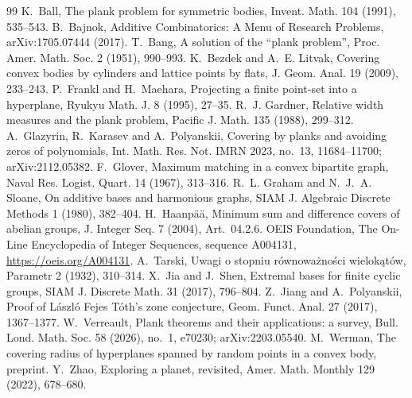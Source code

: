 \documentclass[11pt]{article}
\begin{document}
\begin{thebibliography}{99}
 K.~Ball, The plank problem for symmetric bodies, Invent. Math. 104 (1991), 535--543.
 B.~Bajnok, Additive Combinatorics: A Menu of Research Problems, arXiv:1705.07444 (2017).
 T.~Bang, A solution of the ``plank problem'', Proc. Amer. Math. Soc. 2 (1951), 990--993.
 K.~Bezdek and A.~E. Litvak, Covering convex bodies by cylinders and lattice points by
flats, J. Geom. Anal. 19 (2009), 233--243.
 P.~Frankl and H.~Maehara, Projecting a finite point-set into a hyperplane, Ryukyu Math. J.
8 (1995), 27--35.
 R.~J. Gardner, Relative width measures and the plank problem, Pacific J. Math. 135
(1988), 299--312.
 A.~Glazyrin, R.~Karasev and A.~Polyanskii, Covering by planks and avoiding zeros of
polynomials, Int. Math. Res. Not. IMRN 2023, no.~13, 11684--11700; arXiv:2112.05382.
 F.~Glover, Maximum matching in a convex bipartite graph, Naval Res. Logist. Quart. 14 (1967),
313--316.
 R.~L. Graham and N.~J.~A. Sloane, On additive bases and harmonious graphs, SIAM J.
Algebraic Discrete Methods 1 (1980), 382--404.
 H.~Haanpää, Minimum sum and difference covers of abelian groups, J. Integer Seq. 7
(2004), Art.~04.2.6.
 OEIS Foundation, The On-Line Encyclopedia of Integer Sequences, sequence A004131,
\url{https://oeis.org/A004131}.
 A.~Tarski, Uwagi o stopniu r\'ownowa\.zno\'sci wielok\k{a}t\'ow, Parametr 2 (1932), 310--314.
 X.~Jia and J.~Shen, Extremal bases for finite cyclic groups, SIAM J. Discrete Math. 31
(2017), 796--804.
 Z.~Jiang and A.~Polyanskii, Proof of László Fejes Tóth's zone conjecture, Geom. Funct.
Anal. 27 (2017), 1367--1377.
 W.~Verreault, Plank theorems and their applications: a survey, Bull. Lond. Math. Soc. 58 (2026),
no.~1, e70230; arXiv:2203.05540.
 M.~Werman, The covering radius of hyperplanes spanned by random points in a convex body, preprint.
 Y.~Zhao, Exploring a planet, revisited, Amer. Math. Monthly 129 (2022), 678--680.
\end{thebibliography}

\appendix


\end{document}
